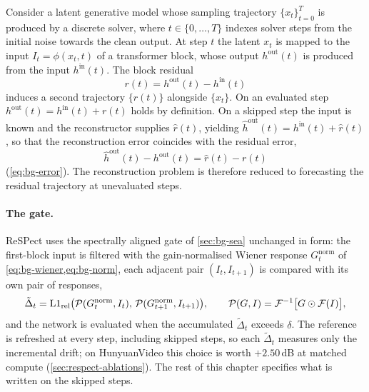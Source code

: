 Consider a latent generative model whose sampling trajectory $\{x_t\}_{t=0}^T$ is produced by a discrete solver, where $t\in\{0,\dots,T\}$ indexes solver steps from the initial noise towards the clean output. At step $t$ the latent $x_t$ is mapped to the input $I_t=\phi(x_t,t)$ of a transformer block, whose output $h^{\mathrm{out}}(t)$ is produced from the input $h^{\mathrm{in}}(t)$. The block residual
\begin{equation}\label{eq:respect-residual}
  r(t) = h^{\mathrm{out}}(t) - h^{\mathrm{in}}(t)
\end{equation}
induces a second trajectory $\{r(t)\}$ alongside $\{x_t\}$. On an evaluated step $h^{\mathrm{out}}(t)=h^{\mathrm{in}}(t)+r(t)$ holds by definition. On a skipped step the input is known and the reconstructor supplies $\hat r(t)$, yielding $\hat h^{\mathrm{out}}(t) = h^{\mathrm{in}}(t)+\hat r(t)$, so that the reconstruction error coincides with the residual error,
\begin{equation}\label{eq:respect-errid}
  \hat h^{\mathrm{out}}(t) - h^{\mathrm{out}}(t) = \hat r(t) - r(t)
\end{equation}
(\cref{eq:bg-error}). The reconstruction problem is therefore reduced to forecasting the residual trajectory at unevaluated steps.

\paragraph{The gate.} ReSPect uses the spectrally aligned gate of \cref{sec:bg-sea} unchanged in form: the first-block input is filtered with the gain-normalised Wiener response $G^{\mathrm{norm}}_t$ of \cref{eq:bg-wiener,eq:bg-norm}, each adjacent pair $(I_t,I_{t+1})$ is compared with its own pair of responses,
\begin{equation}
  \tilde\Delta_t = \mathrm{L1}_{\mathrm{rel}}\big(\mathcal P(G^{\mathrm{norm}}_t,I_t),\,\mathcal P(G^{\mathrm{norm}}_{t+1},I_{t+1})\big), \qquad \mathcal P(G,I) = \mathcal F^{-1}\big[G\odot\mathcal F(I)\big],
\end{equation}
and the network is evaluated when the accumulated $\tilde\Delta_t$ exceeds $\delta$. The reference is refreshed at every step, including skipped steps, so each $\tilde\Delta_t$ measures only the incremental drift; on HunyuanVideo this choice is worth $+2.50$\,dB at matched compute (\cref{sec:respect-ablations}). The rest of this chapter specifies what is written on the skipped steps.

